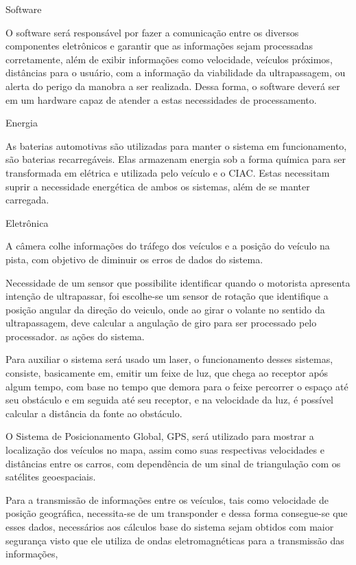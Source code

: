 \begin{itemize}
Software

O software será responsável por fazer a comunicação entre os diversos componentes eletrônicos e garantir que as informações sejam processadas corretamente, além de exibir informações como velocidade, veículos próximos, distâncias para o usuário, com a informação da viabilidade da ultrapassagem, ou alerta do perigo da manobra a ser realizada. Dessa forma, o software deverá ser em um hardware capaz de atender a estas necessidades de processamento.


Energia

As baterias automotivas são utilizadas para manter o sistema em funcionamento, são baterias recarregáveis. Elas armazenam energia sob a forma química para ser transformada em elétrica e utilizada pelo veículo e o CIAC. Estas necessitam suprir a necessidade energética de ambos os sistemas, além de se manter carregada.

Eletrônica

A câmera colhe informações do tráfego dos veículos e a posição do veículo na pista, com objetivo de diminuir os erros de dados do sistema.

Necessidade de um sensor que possibilite  identificar quando o motorista apresenta intenção de ultrapassar, foi escolhe-se um sensor de rotação que identifique a posição angular da direção do veiculo, onde ao girar o volante no sentido da ultrapassagem, deve calcular a angulação de giro para ser processado pelo processador. as ações do sistema.

Para auxiliar o sistema será usado um laser, o funcionamento desses sistemas, consiste, basicamente em, emitir um feixe de luz, que chega ao receptor após algum tempo, com base no tempo que demora para o feixe percorrer o espaço até seu obstáculo e em seguida até seu receptor, e na velocidade da luz, é possível calcular a distância da fonte ao obstáculo.

O Sistema de Posicionamento Global, GPS, será utilizado para mostrar a localização dos veículos no mapa, assim como suas respectivas velocidades e distâncias entre os carros, com dependência de um sinal de triangulação com os satélites geoespaciais.

Para a transmissão de informações entre os veículos, tais como velocidade de posição geográfica, necessita-se de um transponder e dessa forma consegue-se que esses dados, necessários aos cálculos base do sistema sejam obtidos com maior segurança visto que ele utiliza de ondas eletromagnéticas para a transmissão das informações,

\end{itemize}
